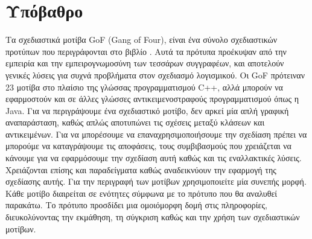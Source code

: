 \section{Υπόβαθρο}
\label{sec:background}
Τα σχεδιαστικά μοτίβα GoF (Gang of Four), είναι ένα σύνολο σχεδιαστικών 
προτύπων που περιγράφονται στο βιβλίο \cite{GoF}. 
Αυτά τα πρότυπα προέκυψαν από την εμπειρία και την εμπειρογνωμοσύνη των 
τεσσάρων συγγραφέων, και αποτελούν γενικές λύσεις για συχνά προβλήματα 
στον σχεδιασμό λογισμικού. Οι GoF πρότειναν 23 μοτίβα στο πλαίσιο της γλώσσας 
προγραμματισμού C++, αλλά μπορούν να εφαρμοστούν και σε άλλες γλώσσες 
αντικειμενοστραφούς προγραμματισμού όπως η Java. 
Για να περιγράψουμε ένα σχεδιαστικό μοτίβο, δεν αρκεί μία απλή γραφική 
αναπαράσταση, καθώς απλώς αποτυπώνει τις σχέσεις μεταξύ κλάσεων και αντικειμένων. 
Για να μπορέσουμε να επαναχρησιμοποιήσουμε την σχεδίαση πρέπει να μπορούμε 
να καταγράψουμε τις αποφάσεις, τους συμβιβασμούς που χρειάζεται 
να κάνουμε για να εφαρμόσουμε την σχεδίαση αυτή καθώς και τις εναλλακτικές λύσεις. 
Χρειάζονται επίσης και παραδείγματα καθώς αναδεικνύουν την εφαρμογή της σχεδίασης 
αυτής. Για την περιγραφή των μοτίβων χρησιμοποιείτε μία συνεπής μορφή. 
Κάθε μοτίβο διαιρείται σε ενότητες σύμφωνα με το πρότυπο που θα αναλυθεί παρακάτω. 
Το πρότυπο προσδίδει μια ομοιόμορφη δομή στις πληροφορίες, 
διευκολύνοντας την εκμάθηση, τη σύγκριση καθώς και την χρήση των 
σχεδιαστικών μοτίβων.
